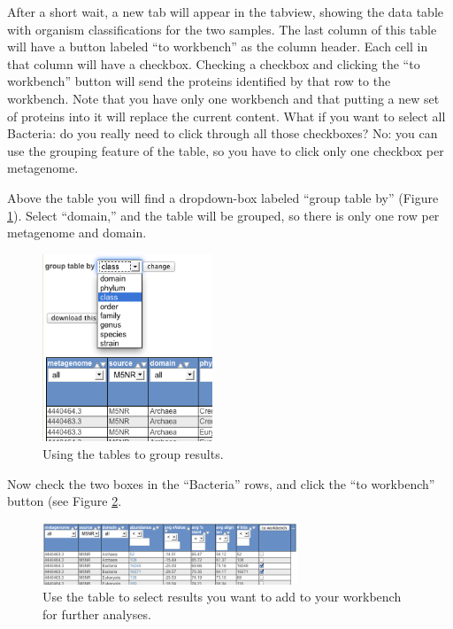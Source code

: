 \documentclass[12pt,fullpage]{report}
\begin{document}
After a short wait, a new tab will appear in the tabview, showing the data table with organism classifications for the two samples. The last column of this table will have a button labeled ``to workbench'' as the column header. Each cell in that column will have a checkbox. Checking a checkbox and clicking the ``to workbench'' button will send the proteins identified by that row to the workbench.
Note that you have only one workbench and that putting a new set of proteins into it will replace the current content. What if you want to select all Bacteria: do you really need to click through all those checkboxes? No: you can use the grouping feature of the table, so you have to click only one checkbox per metagenome.

Above the table you will find a dropdown-box labeled ``group table by'' (Figure \ref{fig:table-group-by-class}). Select ``domain,'' and the table will be grouped, so there is only one row per metagenome and domain.
\begin{figure}[ht]
\begin{center}
\includegraphics[width=2in]{Images/table-group-by-class.png}
\end{center}
\caption{
Using the tables to group results.
}
\label{fig:table-group-by-class}
\end{figure}

Now check the two boxes in the ``Bacteria'' rows, and click the ``to workbench'' button (see Figure \ref{fig:table-organism-abundance}.

\begin{figure}
\begin{center}
\includegraphics[width=3in]{Images/table-organism-abundance.png}
\end{center}
\caption{
Use the table to select results you want to add to your workbench for further analyses.
}
\label{fig:table-organism-abundance}
\end{figure}
\end{document}
